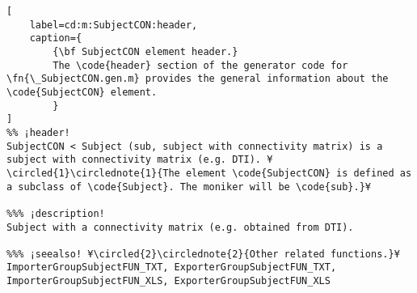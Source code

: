 \documentclass{tufte-handout}
\begin{document}
\begin{lstlisting}[
	label=cd:m:SubjectCON:header,
	caption={
		{\bf SubjectCON element header.}
		The \code{header} section of the generator code for \fn{\_SubjectCON.gen.m} provides the general information about the \code{SubjectCON} element.
		}
]
%% ¡header!
SubjectCON < Subject (sub, subject with connectivity matrix) is a subject with connectivity matrix (e.g. DTI). ¥\circled{1}\circlednote{1}{The element \code{SubjectCON} is defined as a subclass of \code{Subject}. The moniker will be \code{sub}.}¥

%%% ¡description!
Subject with a connectivity matrix (e.g. obtained from DTI).

%%% ¡seealso! ¥\circled{2}\circlednote{2}{Other related functions.}¥
ImporterGroupSubjectFUN_TXT, ExporterGroupSubjectFUN_TXT, ImporterGroupSubjectFUN_XLS, ExporterGroupSubjectFUN_XLS
\end{lstlisting}
\end{document}
